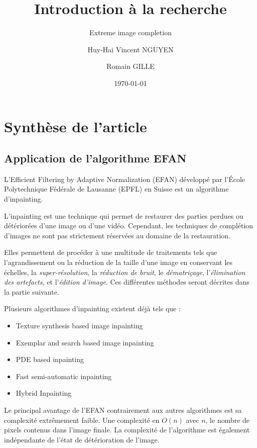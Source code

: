 \documentclass[]{article}
\title{Introduction à la recherche}
\subtitle{Extreme image completion}
\author{Huy-Hai Vincent NGUYEN \and Romain GILLE}
\date{\today}
\providecommand{\tightlist}{%
  \setlength{\itemsep}{0pt}\setlength{\parskip}{0pt}}
\begin{document}
\maketitle

{
\setcounter{tocdepth}{3}
\tableofcontents
}
\newpage

\hypertarget{synthuxe8se-de-larticle}{%
\section{Synthèse de l'article}\label{synthuxe8se-de-larticle}}

\hypertarget{application-de-lalgorithme-efan}{%
\subsection{Application de l'algorithme
EFAN}\label{application-de-lalgorithme-efan}}

L'Efficient Filtering by Adaptive Normalization (EFAN) développé par
l'École Polytechnique Fédérale de Lausanne (EPFL) en Suisse est un
algorithme d'inpainting.

L'inpainting est une technique qui permet de restaurer des parties
perdues ou détériorées d'une image ou d'une vidéo. Cependant, les
techniques de complétion d'images ne sont pas strictement réservées au
domaine de la restauration.

Elles permettent de procéder à une multitude de traitements tels que
l'agrandissement ou la réduction de la taille d'une image en conservant
les échelles, la \emph{super-résolution}, la \emph{réduction de bruit},
le \emph{dématriçage}, l'\emph{élimination des artefacts}, et
l'\emph{édition d'image}. Ces différentes méthodes seront décrites dans
la partie suivante.

Plusieurs algorithmes d'inpainting existent déjà tels que :

\begin{itemize}
\tightlist
\item
  Texture synthesis based image inpainting
\item
  Exemplar and search based image inpainting
\item
  PDE based inpainting
\item
  Fast semi-automatic inpainting
\item
  Hybrid Inpainting
\end{itemize}

Le principal avantage de l'EFAN contrairement aux autres algorithmes est
sa complexité extrêmement faible. Une complexité en \(O(n)\) avec \(n\),
le nombre de pixels contenus dans l'image finale. La complexité de
l'algorithme est également indépendante de l'état de détérioration de
l'image.
\end{document}
